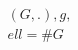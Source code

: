 \documentclass[preview]{standalone}
\begin{document}
\begin{align*}
(G, .), g, \\ell = \# G
\end{align*}
\end{document}
